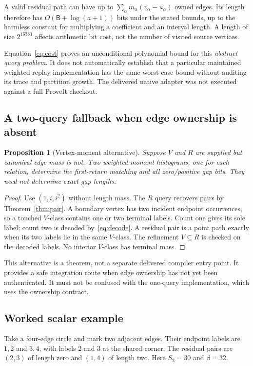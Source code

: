 \documentclass[11pt]{article}
\newtheorem{proposition}[theorem]{Proposition}
\theoremstyle{definition}\newtheorem{definition}[theorem]{Definition}\newtheorem{example}[theorem]{Example}
\theoremstyle{remark}\newtheorem{remark}[theorem]{Remark}
\newcommand{\bits}{\mathsf B}
\begin{document}
A valid residual path can have up to $\sum_\alpha m_\alpha(v_\alpha-u_\alpha)$ owned edges. Its length therefore has $O(\bits+\log(a+1))$ bits under the stated bounds, up to the harmless constant for multiplying a coefficient and an interval length. A length of size $2^{16384}$ affects arithmetic bit cost, not the number of visited source vertices.

Equation~\eqref{eq:cost} proves an unconditional polynomial bound for this \emph{abstract query problem}. It does not automatically establish that a particular maintained weighted replay implementation has the same worst-case bound without auditing its trace and partition growth. The delivered native adapter was not executed against a full ProveIt checkout.

\subsection{A two-query fallback when edge ownership is absent}
\begin{proposition}[Vertex-moment alternative]
\label{prop:twoquery}
Suppose $V$ and $R$ are supplied but canonical edge mass is not. Two weighted moment histograms, one for each relation, determine the first-return matching and all zero/positive gap bits. They need not determine exact gap lengths.
\end{proposition}
\begin{proof}
Use $(1,i,i^2)$ without length mass. The $R$ query recovers pairs by Theorem~\ref{thm:pair}. A boundary vertex has two incident endpoint occurrences, so a touched $V$-class contains one or two terminal labels. Count one gives its sole label; count two is decoded by~\eqref{eq:decode}. A residual pair is a point path exactly when its two labels lie in the same $V$-class. The refinement $V\subseteq R$ is checked on the decoded labels. No interior $V$-class has terminal mass.
\end{proof}

This alternative is a theorem, not a separate delivered compiler entry point. It provides a safe integration route when edge ownership has not yet been authenticated. It must not be confused with the one-query implementation, which uses the ownership contract.

\subsection{Worked scalar example}
Take a four-edge circle and mark two adjacent edges. Their endpoint labels are $1,2$ and $3,4$, with labels $2$ and $3$ at the shared corner. The residual pairs are $(2,3)$ of length zero and $(1,4)$ of length two. Here $S_2=30$ and $\beta=32$.
\end{document}
